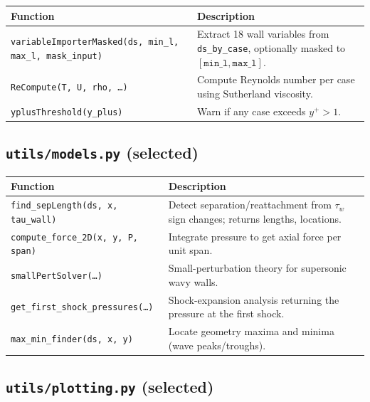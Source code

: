 \documentclass[11pt,letterpaper]{article}
\begin{document}
\begin{table}[h]
\centering
\small
\begin{tabular}{lp{8cm}}
\toprule
\textbf{Function} & \textbf{Description} \\
\midrule
\texttt{variableImporterMasked(ds, min\_l, max\_l, mask\_input)} &
  Extract 18 wall variables from \texttt{ds\_by\_case}, optionally masked to
  $[\texttt{min\_l}, \texttt{max\_l}]$.\\
\texttt{ReCompute(T, U, rho, \ldots)} &
  Compute Reynolds number per case using Sutherland viscosity.\\
\texttt{yplusThreshold(y\_plus)} &
  Warn if any case exceeds $y^+ > 1$.\\
\bottomrule
\end{tabular}
\end{table}

\subsection{\texttt{utils/models.py} (selected)}

\begin{table}[h]
\centering
\small
\begin{tabular}{lp{8cm}}
\toprule
\textbf{Function} & \textbf{Description} \\
\midrule
\texttt{find\_sepLength(ds, x, tau\_wall)} &
  Detect separation/reattachment from $\tau_w$ sign changes; returns
  lengths, locations.\\
\texttt{compute\_force\_2D(x, y, P, span)} &
  Integrate pressure to get axial force per unit span.\\
\texttt{smallPertSolver(\ldots)} &
  Small-perturbation theory for supersonic wavy walls.\\
\texttt{get\_first\_shock\_pressures(\ldots)} &
  Shock-expansion analysis returning the pressure at the first shock.\\
\texttt{max\_min\_finder(ds, x, y)} &
  Locate geometry maxima and minima (wave peaks/troughs).\\
\bottomrule
\end{tabular}
\end{table}

\subsection{\texttt{utils/plotting.py} (selected)}
\end{document}
